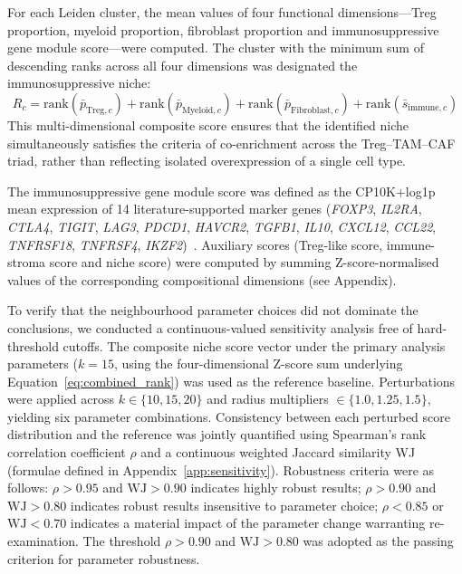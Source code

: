 \documentclass[12pt, a4paper]{article}
\begin{document}
For each Leiden cluster, the mean values of four functional dimensions---Treg proportion, myeloid proportion, fibroblast proportion and immunosuppressive gene module score---were computed. The cluster with the minimum sum of descending ranks across all four dimensions was designated the immunosuppressive niche:
\begin{equation}
R_c = \text{rank}(\bar{p}_{\text{Treg},c}) + \text{rank}(\bar{p}_{\text{Myeloid},c})
+ \text{rank}(\bar{p}_{\text{Fibroblast},c}) + \text{rank}(\bar{s}_{\text{immune},c})
\label{eq:combined_rank}
\end{equation}
This multi-dimensional composite score ensures that the identified niche simultaneously satisfies the criteria of co-enrichment across the Treg--TAM--CAF triad, rather than reflecting isolated overexpression of a single cell type.

The immunosuppressive gene module score was defined as the CP10K+log1p mean expression of 14 literature-supported marker genes (\textit{FOXP3}, \textit{IL2RA}, \textit{CTLA4}, \textit{TIGIT}, \textit{LAG3}, \textit{PDCD1}, \textit{HAVCR2}, \textit{TGFB1}, \textit{IL10}, \textit{CXCL12}, \textit{CCL22}, \textit{TNFRSF18}, \textit{TNFRSF4}, \textit{IKZF2})~\citep{sakaguchi2020regulatory,sharma2023immunosuppressive}. Auxiliary scores (Treg-like score, immune-stroma score and niche score) were computed by summing Z-score-normalised values of the corresponding compositional dimensions (see Appendix).

To verify that the neighbourhood parameter choices did not dominate the conclusions, we conducted a continuous-valued sensitivity analysis free of hard-threshold cutoffs. The composite niche score vector under the primary analysis parameters ($k = 15$, using the four-dimensional Z-score sum underlying Equation~\ref{eq:combined_rank}) was used as the reference baseline. Perturbations were applied across $k \in \{10, 15, 20\}$ and radius multipliers $\in \{1.0, 1.25, 1.5\}$, yielding six parameter combinations. Consistency between each perturbed score distribution and the reference was jointly quantified using Spearman's rank correlation coefficient $\rho$ and a continuous weighted Jaccard similarity WJ (formulae defined in Appendix~\ref{app:sensitivity}). Robustness criteria were as follows: $\rho > 0.95$ and $\text{WJ} > 0.90$ indicates highly robust results; $\rho > 0.90$ and $\text{WJ} > 0.80$ indicates robust results insensitive to parameter choice; $\rho < 0.85$ or $\text{WJ} < 0.70$ indicates a material impact of the parameter change warranting re-examination. The threshold $\rho > 0.90$ and $\text{WJ} > 0.80$ was adopted as the passing criterion for parameter robustness.
\end{document}
